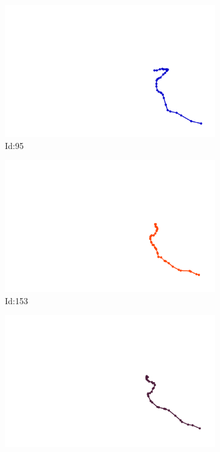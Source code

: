 \documentclass[12pt,twoside]{report}
\begin{document}
\begin{figure}
\centering
\begin{subfigure}[b]{0.20\textwidth}
\centering
\includegraphics[width=\textwidth]{../../trajectories/95.png}
\caption{Id:95}
\end{subfigure}
\begin{subfigure}[b]{0.20\textwidth}
\centering
\includegraphics[width=\textwidth]{../../trajectories/153.png}
\caption{Id:153}
\end{subfigure}
\begin{subfigure}[b]{0.20\textwidth}
\centering
\includegraphics[width=\textwidth]{../../trajectories/351.png}

\end{subfigure}
\end{figure}
\end{document}
